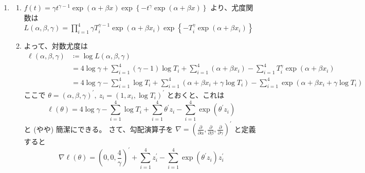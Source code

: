 \documentclass[./main.tex]{subfiles}
\begin{document}
\begin{enumerate}
\begin{enumerate}
        \end{enumerate} 

        \item
        \begin{enumerate}
            \item $f(t) = \gamma t^{\gamma - 1} \exp (\alpha + \beta x)
                \exp \left\{ -t^\gamma \exp (\alpha + \beta x) \right\}$
            より、尤度関数は\\
            $\displaystyle L(\alpha, \beta, \gamma)
                = \prod_{i=1}^{4}
                    \gamma T_i^{\gamma - 1} \exp (\alpha + \beta x_i)
                    \exp \left\{ -T_i^\gamma \exp (\alpha + \beta x_i) \right\}$\\
            \item よって、対数尤度は
            \begin{align*}
                \ell (\alpha, \beta, \gamma)
                    &\coloneq \log L(\alpha, \beta, \gamma)\\
                    &= 4 \log \gamma 
                        + \sum_{i=1}^4 (\gamma - 1) \log T_i
                        + \sum_{i=1}^4 (\alpha + \beta x_i)
                        - \sum_{i=1}^{4} T_i^\gamma \exp (\alpha + \beta x_i)\\
                    &= 4 \log \gamma
                        - \sum_{i=1}^{4} \log T_i
                        + \sum_{i=1}^{4} (\alpha + \beta x_i + \gamma \log T_i)
                        - \sum_{i=1}^{4} \exp \left( \alpha + \beta x_i + \gamma \log T_i \right)
            \end{align*}
            ここで $\theta = (\alpha, \beta, \gamma)^\prime, \ 
                z_i = (1, x_i, \log T_i)^\prime$ 
            とおくと、これは
            \begin{equation*}
                \ell (\theta)
                    = 4 \log \gamma - \sum_{i=1}^{4} \log T_i
                        + \sum_{i=1}^{4} \theta^\prime z_i
                        - \sum_{i=1}^4 \exp(\theta^\prime z_i)
            \end{equation*}
            と (やや) 簡潔にできる。
            さて、勾配演算子を $\nabla = (\frac{\partial}{\partial \alpha}, \frac{\partial}{\partial \beta}, \frac{\partial}{\partial \gamma})^\prime$
            と定義すると
            \begin{equation*}
                \nabla \ell (\theta)
                    = \left( 0, 0, \frac{4}{\gamma} \right)^\prime
                        + \sum_{i=1}^4 z_i^\prime
                        - \sum_{i=1}^{4} \exp(\theta^\prime z_i) z_i^\prime

\end{equation*}
\end{enumerate}
\end{enumerate}
\end{document}
